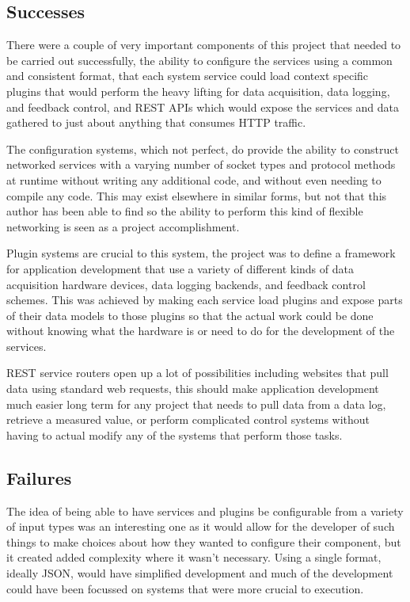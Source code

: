   \subsection{Successes}\label{sec:results-successes}

    There were a couple of very important components of this project that
    needed to be carried out successfully, the ability to configure the
    services using a common and consistent format, that each system service
    could load context specific plugins that would perform the heavy lifting
    for data acquisition, data logging, and feedback control, and REST APIs
      which would expose the services and data gathered to just about anything
      that consumes HTTP traffic.

    The configuration systems, which not perfect, do provide the ability to
    construct networked services with a varying number of socket types and
    protocol methods at runtime without writing any additional code, and
    without even needing to compile any code. This may exist elsewhere in
    similar forms, but not that this author has been able to find so the
    ability to perform this kind of flexible networking is seen as a project
    accomplishment.

    Plugin systems are crucial to this system, the project was to define a
    framework for application development that use a variety of different kinds
    of data acquisition hardware devices, data logging backends, and feedback
    control schemes. This was achieved by making each service load plugins and
    expose parts of their data models to those plugins so that the actual work
    could be done without knowing what the hardware is or need to do for the
    development of the services.

    REST service routers open up a lot of possibilities including websites that
    pull data using standard web requests, this should make application
    development much easier long term for any project that needs to pull data
    from a data log, retrieve a measured value, or perform complicated control
    systems without having to actual modify any of the systems that perform
    those tasks.

  \subsection{Failures}\label{sec:results-failures}

    The idea of being able to have services and plugins be configurable from a
    variety of input types was an interesting one as it would allow for the
    developer of such things to make choices about how they wanted to configure
    their component, but it created added complexity where it wasn't necessary.
    Using a single format, ideally JSON, would have simplified development and
    much of the development could have been focussed on systems that were more
    crucial to execution.

